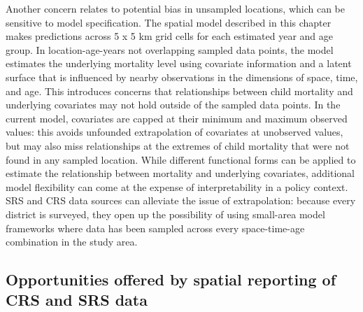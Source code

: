 \documentclass[
]{report}
\begin{document}
Another concern relates to potential bias in unsampled locations, which can be sensitive to model specification. The spatial model described in this chapter makes predictions across 5 x 5 km grid cells for each estimated year and age group. In location-age-years not overlapping sampled data points, the model estimates the underlying mortality level using covariate information and a latent surface that is influenced by nearby observations in the dimensions of space, time, and age.\autocite{Diggle2016,Burstein2019} This introduces concerns that relationships between child mortality and underlying covariates may not hold outside of the sampled data points. In the current model, covariates are capped at their minimum and maximum observed values: this avoids unfounded extrapolation of covariates at unobserved values, but may also miss relationships at the extremes of child mortality that were not found in any sampled location. While different functional forms can be applied to estimate the relationship between mortality and underlying covariates, additional model flexibility can come at the expense of interpretability in a policy context.\autocite{Pletcher1999,Lucas2020a} SRS and CRS data sources can alleviate the issue of extrapolation: because every district is surveyed, they open up the possibility of using small-area model frameworks where data has been sampled across every space-time-age combination in the study area.\autocite{Wakefield2020}

\hypertarget{opportunities-offered-by-spatial-reporting-of-crs-and-srs-data}{%
\subsection{Opportunities offered by spatial reporting of CRS and SRS data}\label{opportunities-offered-by-spatial-reporting-of-crs-and-srs-data}}
\end{document}
